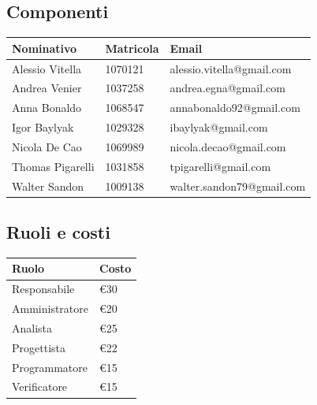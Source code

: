 \documentclass[12pt,a4paper]{article}
\begin{document}
\subsection{Componenti}

\begin{tabular}{| l | l | l |}
    \hline
    Nominativo & Matricola & Email \\ \hline
    Alessio Vitella & 1070121 & alessio.vitella@gmail.com \\ \hline
    Andrea Venier & 1037258 & andrea.egna@gmail.com \\ \hline
    Anna Bonaldo & 1068547 & annabonaldo92@gmail.com \\ \hline
    Igor Baylyak & 1029328 & ibaylyak@gmail.com \\ \hline
    Nicola De Cao & 1069989 & nicola.decao@gmail.com \\ \hline
    Thomas Pigarelli & 1031858 & tpigarelli@gmail.com \\ \hline
    Walter Sandon & 1009138 & walter.sandon79@gmail.com \\ \hline
\end{tabular}

\subsection{Ruoli e costi}

\begin{tabular}{| l | l |}
    \hline
    Ruolo & Costo \\ \hline
    Responsabile & \euro{}30 \\ \hline
    Amministratore & \euro{}20 \\ \hline
    Analista & \euro{}25 \\ \hline
    Progettista & \euro{}22 \\ \hline
    Programmatore & \euro{}15 \\ \hline
    Verificatore & \euro{}15 \\ \hline
\end{tabular}
\end{document}
